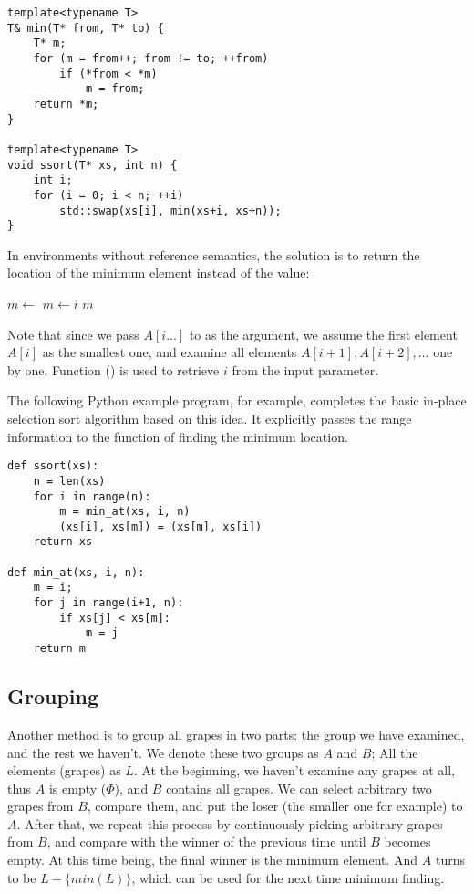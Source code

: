 \documentclass{article}
\begin{document}
\lstset{language=C++}
\begin{lstlisting}
template<typename T>
T& min(T* from, T* to) {
    T* m;
    for (m = from++; from != to; ++from)
        if (*from < *m)
            m = from;
    return *m;
}

template<typename T>
void ssort(T* xs, int n) {
    int i;
    for (i = 0; i < n; ++i)
        std::swap(xs[i], min(xs+i, xs+n));
}
\end{lstlisting}

In environments without reference semantics, the solution is to return the location
of the minimum element instead of the value:

\begin{algorithmic}
  \State $m \gets$ 
      \State $m \gets i$
    \EndIf
  \EndFor
  \State \Return $m$
\EndFunction
\end{algorithmic}

Note that since we pass $A[i...]$ to  as the argument, we assume the first
element $A[i]$ as the smallest one, and examine all elements $A[i+1], A[i+2], ...$ one by one.
Function () is used to retrieve $i$ from the input parameter.

The following Python example program, for example, completes the basic in-place
selection sort algorithm based on this idea. It explicitly passes the range information
to the function of finding the minimum location.

\lstset{language=Python}
\begin{lstlisting}
def ssort(xs):
    n = len(xs)
    for i in range(n):
        m = min_at(xs, i, n)
        (xs[i], xs[m]) = (xs[m], xs[i])
    return xs

def min_at(xs, i, n):
    m = i;
    for j in range(i+1, n):
        if xs[j] < xs[m]:
            m = j
    return m
\end{lstlisting}

\subsection{Grouping}
Another method is to group all grapes in two parts: the group we have examined, and the rest we
haven't. We denote these two groups as $A$ and $B$; All the elements (grapes) as $L$.
At the beginning, we haven't examine any grapes at all, thus $A$ is empty ($\Phi$), and
$B$ contains all grapes. We can select arbitrary two grapes from $B$, compare them, and
put the loser (the smaller one for example) to $A$. After that, we repeat this process
by continuously picking arbitrary grapes from $B$, and compare with the winner of the
previous time until $B$ becomes empty. At this time being, the final winner is the
minimum element. And $A$ turns to be $L - \{min(L)\}$, which can be used for the next
time minimum finding.
\end{document}
